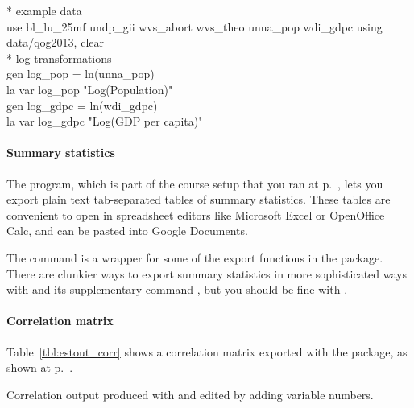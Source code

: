 \begin{docspec}
  * example data\\%
  use bl\_lu\_25mf undp\_gii wvs\_abort wvs\_theo unna\_pop wdi\_gdpc using data/qog2013, clear\\%
  * log-transformations\\%
  gen log\_pop = ln(unna\_pop)\\%
  la var log\_pop "Log(Population)"\\%
  gen log\_gdpc = ln(wdi\_gdpc)\\%
  la var log\_gdpc "Log(GDP per capita)"
\end{docspec}

%
\paragraph{Summary statistics}%
  The  program, which is part of the course setup that you ran at p.~\pageref{sec:course-setup}, lets you export plain text tab-separated tables of summary statistics. These tables are convenient to open in spreadsheet editors like Microsoft Excel or OpenOffice Calc, and can be pasted into Google Documents.%

  The  command is a wrapper for some of the export functions in the  package. There are clunkier ways to export summary statistics in more sophisticated ways with  and its supplementary command , but you should be fine with .%

%
\paragraph{Correlation matrix}%
  Table~\ref{tbl:estout_corr} shows a correlation matrix exported with the  package, as shown at p.~\pageref{tbl:correlate_export}.%

\begin{fullwidth}
	\begin{table}
		\footnotesize
    
		\caption{Correlation output produced with  and edited by adding variable numbers.}
		\label{tbl:estout_corr}
	\end{table}
\end{fullwidth}

